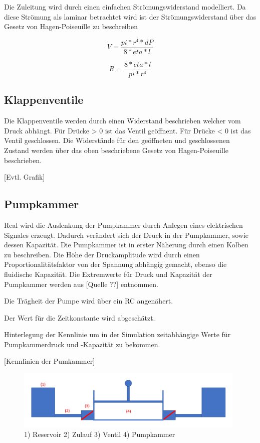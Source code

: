 \documentclass[fontsize=12pt, a4paper]{scrartcl}
\begin{document}
Die Zuleitung wird durch einen einfachen Strömungswiderstand modelliert. Da diese Strömung als laminar betrachtet wird ist der Strömungswiderstand über das Gesetz von Hagen-Poiseuille zu beschreiben

\[ \dot{V} = \frac{pi * r^4 * dP}{8* eta *l} \]

\[ R = \frac{8* eta *l}{pi * r^4} \]

\subsection{Klappenventile}

Die Klappenventile werden durch einen Widerstand beschrieben welcher vom Druck abhängt. Für Drücke > 0 ist das Ventil geöffnent. Für Drücke < 0 ist das Ventil geschlossen. Die Widerstände für den geöffneten und geschlossenen Zustand werden über das oben beschriebene Gesetz von Hagen-Poiseuille beschrieben.

[Evtl. Grafik]

\subsection{Pumpkammer}
Real wird die Auslenkung der Pumpkammer durch Anlegen eines elektrischen Signales erzeugt. Dadurch verändert sich der Druck in der Pumpkammer, sowie dessen Kapazität. Die Pumpkammer ist in erster Näherung durch einen Kolben zu beschreiben. Die Höhe der Druckamplitude wird durch einen Proportionalitätsfaktor von der Spannung abhängig gemacht, ebenso die fluidische Kapazität. Die Extremwerte für Druck und Kapazität der Pumpkammer werden aus [Quelle ??] entnommen.

Die Trägheit der Pumpe wird über ein RC angenähert.

Der Wert für die Zeitkonstante wird abgeschätzt.

Hinterlegung der Kennlinie um in der Simulation zeitabhängige Werte für Pumpkammerdruck und -Kapazität zu bekommen.

[Kennlinien der Pumkammer]

\begin{figure}[H]
	\centering
	\includegraphics[width=0.98\textwidth]{bilder/theorie/pumpe_prinzipskizze.PNG}
	\caption{1) Reservoir 2) Zulauf 3) Ventil 4) Pumpkammer}
\end{figure}
\end{document}
